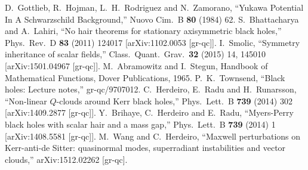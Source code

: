 \begin{small}
\begin{thebibliography}{99}
  D.~Gottlieb, R.~Hojman, L.~H.~Rodriguez and N.~Zamorano,
  ``Yukawa Potential In A Schwarzschild Background,''
  Nuovo Cim.\ B {\bf 80} (1984) 62.
  S.~Bhattacharya and A.~Lahiri,
   ``No hair theorems for stationary axisymmetric black holes,''
  Phys.\ Rev.\ D {\bf 83} (2011) 124017
  [arXiv:1102.0053 [gr-qc]].
  I.~Smolic,
  ``Symmetry inheritance of scalar fields,''
  Class.\ Quant.\ Grav.\  {\bf 32} (2015) 14,  145010
  [arXiv:1501.04967 [gr-qc]].
M.~Abramowitz and I.~Stegun,
Handbook of Mathematical Functions, Dover Publications, 1965.
  P.~K.~Townsend,
  ``Black holes: Lecture notes,''
  gr-qc/9707012.
  C.~Herdeiro, E.~Radu and H.~Runarsson,
  ``Non-linear $Q$-clouds around Kerr black holes,''
  Phys.\ Lett.\ B {\bf 739} (2014) 302
  [arXiv:1409.2877 [gr-qc]].
  Y.~Brihaye, C.~Herdeiro and E.~Radu,
  ``Myers-Perry black holes with scalar hair and a mass gap,''
  Phys.\ Lett.\ B {\bf 739} (2014) 1
  [arXiv:1408.5581 [gr-qc]].
  M.~Wang and C.~Herdeiro,
  ``Maxwell perturbations on Kerr-anti-de Sitter: quasinormal modes, superradiant instabilities and vector clouds,''
  arXiv:1512.02262 [gr-qc].

\end{thebibliography}
\end{small}

